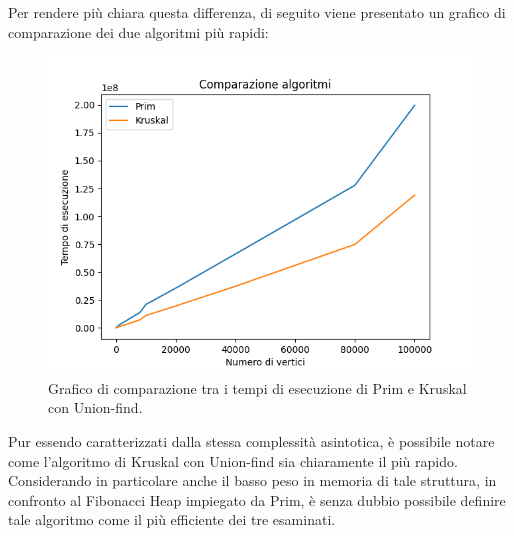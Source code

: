 Per rendere più chiara questa differenza, di seguito viene presentato un grafico di comparazione dei due algoritmi più rapidi:
\begin{figure}[H]
	\centering
	\includegraphics[width=1\linewidth]{"../graphs/2algo"}
	\caption{Grafico di comparazione tra i tempi di esecuzione di Prim e Kruskal con Union-find.}
	\label{fig:2-comparison-graph}
\end{figure}
Pur essendo caratterizzati dalla stessa complessità asintotica, è possibile notare come l'algoritmo di Kruskal con Union-find sia chiaramente il più rapido. Considerando in particolare anche il basso peso in memoria di tale struttura, in confronto al Fibonacci Heap impiegato da Prim, è senza dubbio possibile definire tale algoritmo come il più efficiente dei tre esaminati.